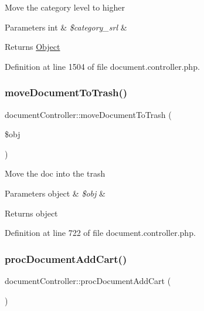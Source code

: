 Move the category level to higher 
\begin{DoxyParams}[1]{Parameters}
int & {\em \$category\+\_\+srl} & \\
\hline
\end{DoxyParams}
\begin{DoxyReturn}{Returns}
\hyperlink{classObject}{Object} 
\end{DoxyReturn}


Definition at line 1504 of file document.\+controller.\+php.

\mbox{\label{classdocumentController_a3f861f8df6113ca3211c48be3c49f305}} 
\subsubsection{\texorpdfstring{move\+Document\+To\+Trash()}{moveDocumentToTrash()}}
{\footnotesize\ttfamily document\+Controller\+::move\+Document\+To\+Trash (\begin{DoxyParamCaption}\item[{}]{\$obj }\end{DoxyParamCaption})}

Move the doc into the trash 
\begin{DoxyParams}[1]{Parameters}
object & {\em \$obj} & \\
\hline
\end{DoxyParams}
\begin{DoxyReturn}{Returns}
object 
\end{DoxyReturn}


Definition at line 722 of file document.\+controller.\+php.

\mbox{\label{classdocumentController_a9072167f6533f269be32a0a43e147dae}} 
\subsubsection{\texorpdfstring{proc\+Document\+Add\+Cart()}{procDocumentAddCart()}}
{\footnotesize\ttfamily document\+Controller\+::proc\+Document\+Add\+Cart (\begin{DoxyParamCaption}{ }\end{DoxyParamCaption})}

